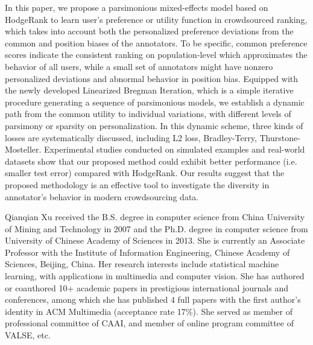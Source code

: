 \documentclass[10pt,journal,cspaper,compsoc]{IEEEtran}
\begin{document}
{In this paper, we propose a parsimonious mixed-effects model based on HodgeRank to learn user's preference or utility function in crowdsourced ranking, which
takes into account both the personalized preference deviations from the common and position biases of the annotators.
To be specific, common preference scores indicate the consistent ranking on population-level which approximates the behavior of
all users, while a small set of annotators might have nonzero
personalized deviations and abnormal behavior in position bias. Equipped with the newly developed Linearized
Bregman Iteration, which is a simple iterative procedure generating a sequence of parsimonious models,  we establish a dynamic path from the common utility to individual
variations, with different levels of parsimony or sparsity on personalization. In this dynamic scheme, three kinds of losses are systematically discussed, including  L2 loss, Bradley-Terry, Thurstone-Mosteller.
Experimental studies conducted on simulated examples and real-world
datasets show that our proposed method could exhibit better performance (i.e.
smaller test error) compared with HodgeRank.
Our results suggest that the proposed methodology is an effective tool to investigate the diversity in annotator's behavior
in modern crowdsourcing data.

\ifCLASSOPTIONcaptionsoff
  \newpage
\fi



 

\vspace{0cm}\begin{biography}{Qianqian Xu received the B.S. degree in computer science from China University of Mining and Technology in 2007 and the Ph.D. degree in computer science from University of Chinese Academy of Sciences in 2013. She is currently an Associate Professor with the Institute of Information Engineering, Chinese Academy of Sciences, Beijing, China. Her research interests include statistical machine learning, with applications in multimedia and computer vision. She has authored or coauthored 10+ academic papers in prestigious international journals and conferences, among which she has published 4 full papers with the first author's identity in ACM Multimedia (acceptance rate 17\%).  She served as member of professional committee of CAAI, and member of online program committee of VALSE, etc.}
\end{biography}

}
\end{document}
